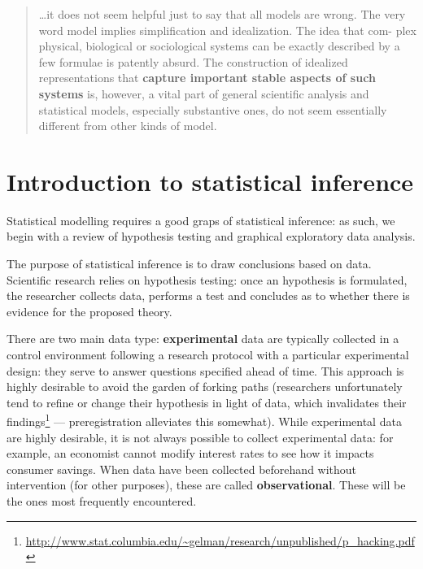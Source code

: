 \documentclass[
  11pt,
  letterpaper,
]{book}
\renewcommand{\href}[2]{#2\footnote{\url{#1}}}
\theoremstyle{definition}
\theoremstyle{definition}
\theoremstyle{definition}
\theoremstyle{remark}
\begin{document}
\begin{quote}
\ldots it does not seem helpful just to say that all models are wrong. The very word model implies simplification and idealization. The idea that com-
plex physical, biological or sociological systems can be exactly described
by a few formulae is patently absurd. The construction of idealized representations that \textbf{capture important stable aspects of such systems}
is, however, a vital part of general scientific analysis and statistical models, especially substantive ones, do not seem essentially different from
other kinds of model.
\end{quote}

\newcommand{\bs}[1]{\boldsymbol{#1}}
\newcommand{\Hmat}{\mathbf{H}}
\newcommand{\Mmat}{\mathbf{M}}
\newcommand{\mX}{\mathbf{X}}
\newcommand{\bX}{{\mathbf{X}}}
\newcommand{\bx}{{\mathbf{x}}}
\newcommand{\by}{{\boldsymbol{y}}}
\newcommand{\bY}{{\boldsymbol{Y}}}
\newcommand{\eps}{\varepsilon}
\newcommand{\beps}{\boldsymbol{\varepsilon}}
\newcommand{\bbeta}{\boldsymbol{\beta}}
\newcommand{\hbb}{\hat{\boldsymbol{\beta}}}
\newcommand{\limni}{\lim_{n \ra \infty}}
\newcommand{\Sp}{\mathscr{S}}
\newcommand{\Hy}{\mathscr{H}}
\newcommand{\E}[2][]{{\mathsf E}_{#1}\left(#2\right)}
\newcommand{\Va}[2][]{{\mathsf{Var}_{#1}}\left(#2\right)}
\newcommand{\I}[1]{{\mathbf 1}_{#1}}

\hypertarget{intro}{%
\chapter{Introduction to statistical inference}\label{intro}}

Statistical modelling requires a good graps of statistical inference: as such, we begin with a review of hypothesis testing and graphical exploratory data analysis.

The purpose of statistical inference is to draw conclusions based on data. Scientific research relies on hypothesis testing: once an hypothesis is formulated, the researcher collects data, performs a test and concludes as to whether there is evidence for the proposed theory.

There are two main data type: \textbf{experimental} data are typically collected in a control environment following a research protocol with a particular experimental design: they serve to answer questions specified ahead of time. This approach is highly desirable to avoid the garden of forking paths \href{http://www.stat.columbia.edu/~gelman/research/unpublished/p_hacking.pdf}{(researchers unfortunately tend to refine or change their hypothesis in light of data, which invalidates their findings} --- preregistration alleviates this somewhat). While experimental data are highly desirable, it is not always possible to collect experimental data: for example, an economist cannot modify interest rates to see how it impacts consumer savings. When data have been collected beforehand without intervention (for other purposes), these are called \textbf{observational}. These will be the ones most frequently encountered.
\end{document}
